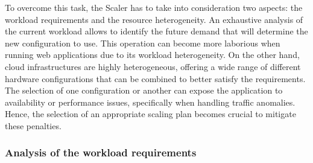 
To overcome this task, the Scaler has to take into consideration two aspects: the workload requirements and the resource heterogeneity. An exhaustive analysis of the current workload allows to identify the future demand that will determine the new configuration to use. This operation can become more laborious when running web applications due to its workload heterogeneity. On the other hand, cloud infrastructures are highly heterogeneous, offering a wide range of different hardware configurations that can be combined to better satisfy the requirements. The selection of one configuration or another can expose the application to availability or performance issues, specifically when handling traffic anomalies. Hence, the selection of an appropriate scaling plan becomes crucial to mitigate these penalties. 








\subsubsection{Analysis of the workload requirements}

